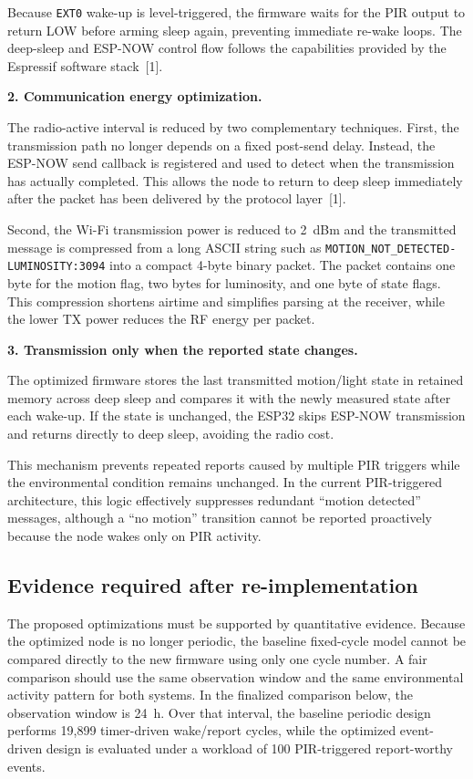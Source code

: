 \documentclass[11pt,a4paper]{article}
\begin{document}
Because \texttt{EXT0} wake-up is level-triggered, the firmware waits for the PIR output to return LOW before arming sleep again, preventing immediate re-wake loops. The deep-sleep and ESP-NOW control flow follows the capabilities provided by the Espressif software stack~[1].

\textbf{2. Communication energy optimization.}

The radio-active interval is reduced by two complementary techniques. First, the transmission path no longer depends on a fixed post-send delay. Instead, the ESP-NOW send callback is registered and used to detect when the transmission has actually completed. This allows the node to return to deep sleep immediately after the packet has been delivered by the protocol layer~[1].

Second, the Wi-Fi transmission power is reduced to \SI{2}{dBm} and the transmitted message is compressed from a long ASCII string such as \texttt{MOTION\_NOT\_DETECTED-LUMINOSITY:3094} into a compact 4-byte binary packet. The packet contains one byte for the motion flag, two bytes for luminosity, and one byte of state flags. This compression shortens airtime and simplifies parsing at the receiver, while the lower TX power reduces the RF energy per packet.

\textbf{3. Transmission only when the reported state changes.}

The optimized firmware stores the last transmitted motion/light state in retained memory across deep sleep and compares it with the newly measured state after each wake-up. If the state is unchanged, the ESP32 skips ESP-NOW transmission and returns directly to deep sleep, avoiding the radio cost.

This mechanism prevents repeated reports caused by multiple PIR triggers while the environmental condition remains unchanged. In the current PIR-triggered architecture, this logic effectively suppresses redundant ``motion detected'' messages, although a ``no motion'' transition cannot be reported proactively because the node wakes only on PIR activity.


\subsection{Evidence required after re-implementation}
The proposed optimizations must be supported by quantitative evidence. Because the optimized node is no longer periodic, the baseline fixed-cycle model cannot be compared directly to the new firmware using only one cycle number. A fair comparison should use the same observation window and the same environmental activity pattern for both systems. In the finalized comparison below, the observation window is \SI{24}{h}. Over that interval, the baseline periodic design performs 19,899 timer-driven wake/report cycles, while the optimized event-driven design is evaluated under a workload of 100 PIR-triggered report-worthy events.
\end{document}
